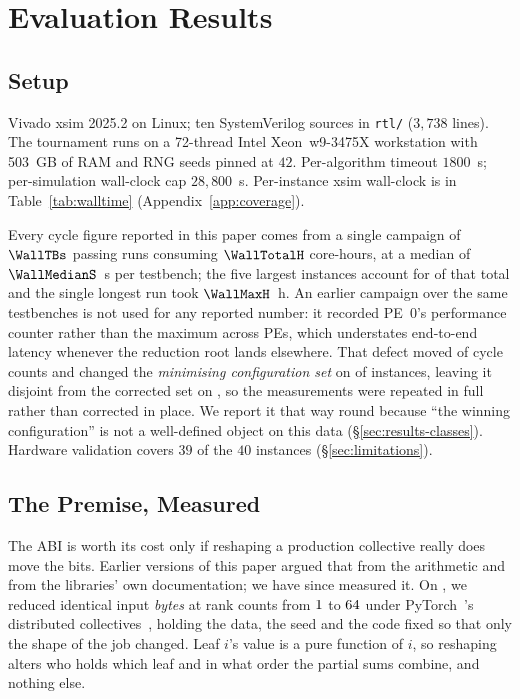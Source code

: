 \documentclass[journal,10pt]{IEEEtran}
\theoremstyle{plain}
\theoremstyle{definition}
\theoremstyle{remark}
\newcommand{\sv}[1]{\texttt{#1}}
\begin{document}
\section{Evaluation Results}\label{sec:results}

\subsection{Setup}\label{sec:results-setup}

Vivado xsim 2025.2 on Linux; ten SystemVerilog sources in \sv{rtl/}
($3{,}738$ lines). The tournament runs on a 72-thread Intel Xeon~w9-3475X
workstation with 503~GB of RAM and RNG seeds pinned at $42$.
Per-algorithm timeout $1800$~s; per-simulation wall-clock cap $28{,}800$~s.
Per-instance xsim wall-clock is in Table~\ref{tab:walltime} (Appendix~\ref{app:coverage}).

Every cycle figure reported in this paper comes from a single campaign of
$\WallTBs$ passing runs consuming $\WallTotalH$ core-hours, at a median of
$\WallMedianS$~s per testbench; the five largest instances account for
\WallGiantShare{} of that total and the single longest run took
$\WallMaxH$~h. An earlier campaign over the same
testbenches is not used for any reported number: it recorded PE~0's
performance counter rather than the maximum across PEs, which understates
end-to-end latency whenever the reduction root lands elsewhere. That defect
moved \ClsFragilePct{} of cycle counts and changed the \emph{minimising
configuration set} on \ClsFragileChanged{} of \TournNInst{} instances,
leaving it disjoint from the corrected set on \ClsFragileDisjoint{}, so the
measurements were repeated in full rather than corrected in place. We report
it that way round because ``the winning configuration'' is not a well-defined
object on this data (\S\ref{sec:results-classes}). Hardware validation covers $39$ of the $40$ instances
(\S\ref{sec:limitations}).

\subsection{The Premise, Measured}\label{sec:results-premise}

The ABI is worth its cost only if reshaping a production collective really
does move the bits. Earlier versions of this paper argued that from the
arithmetic and from the libraries' own documentation; we have since measured
it. On \GpuHardware{}, we reduced identical input \emph{bytes} at
\GpuWorldSizes{} rank counts from $1$ to $64$ under
PyTorch~\GpuStack{}'s distributed collectives~\cite{li2020pytorch}, holding
the data, the seed and the code
fixed so that only the shape of the job changed. Leaf $i$'s value is a pure
function of $i$, so reshaping alters who holds which leaf and in what order
the partial sums combine, and nothing else.
\end{document}
